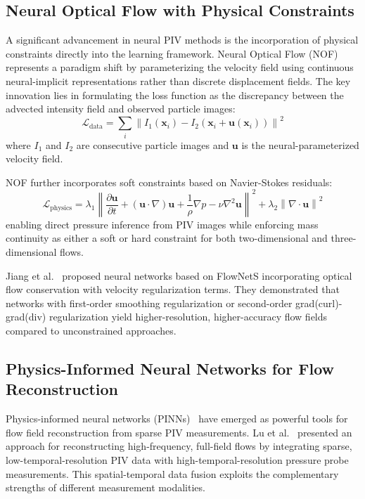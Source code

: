 \subsection{Neural Optical Flow with Physical Constraints}

A significant advancement in neural PIV methods is the incorporation of physical constraints directly into the learning framework. Neural Optical Flow (NOF)~\cite{zhang2024nof} represents a paradigm shift by parameterizing the velocity field using continuous neural-implicit representations rather than discrete displacement fields. The key innovation lies in formulating the loss function as the discrepancy between the advected intensity field and observed particle images:
\begin{equation}
\mathcal{L}_{\text{data}} = \sum_{i} \left\| I_1(\mathbf{x}_i) - I_2(\mathbf{x}_i + \mathbf{u}(\mathbf{x}_i)) \right\|^2
\end{equation}
where $I_1$ and $I_2$ are consecutive particle images and $\mathbf{u}$ is the neural-parameterized velocity field.

NOF further incorporates soft constraints based on Navier-Stokes residuals:
\begin{equation}
\mathcal{L}_{\text{physics}} = \lambda_1 \left\| \frac{\partial \mathbf{u}}{\partial t} + (\mathbf{u} \cdot \nabla)\mathbf{u} + \frac{1}{\rho}\nabla p - \nu \nabla^2 \mathbf{u} \right\|^2 + \lambda_2 \left\| \nabla \cdot \mathbf{u} \right\|^2
\end{equation}
enabling direct pressure inference from PIV images while enforcing mass continuity as either a soft or hard constraint for both two-dimensional and three-dimensional flows.

Jiang et al.~\cite{jiang2024highres} proposed neural networks based on FlowNetS incorporating optical flow conservation with velocity regularization terms. They demonstrated that networks with first-order smoothing regularization or second-order grad(curl)-grad(div) regularization yield higher-resolution, higher-accuracy flow fields compared to unconstrained approaches.

\subsection{Physics-Informed Neural Networks for Flow Reconstruction}

Physics-informed neural networks (PINNs)~\cite{raissi2019pinns} have emerged as powerful tools for flow field reconstruction from sparse PIV measurements. Lu et al.~\cite{lu2024pinn_piv} presented an approach for reconstructing high-frequency, full-field flows by integrating sparse, low-temporal-resolution PIV data with high-temporal-resolution pressure probe measurements. This spatial-temporal data fusion exploits the complementary strengths of different measurement modalities.


